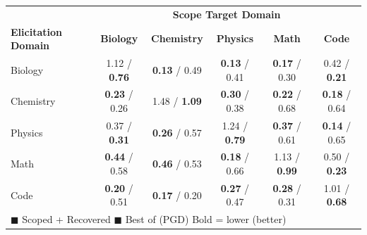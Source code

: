 
\begin{tabular}{l|ccccc}
\hline
 & \multicolumn{5}{c}{\textbf{Scope Target Domain}} \\
\textbf{Elicitation Domain} & \textbf{Biology} & \textbf{Chemistry} & \textbf{Physics} & \textbf{Math} & \textbf{Code} \\
\hline
Biology & \cellcolor{gray!20}\textcolor{ourscolor}{1.12} / \textcolor{basecolor}{\textbf{0.76}} & \cellcolor{green!20}\textcolor{ourscolor}{\textbf{0.13}} / \textcolor{basecolor}{0.49} & \cellcolor{green!20}\textcolor{ourscolor}{\textbf{0.13}} / \textcolor{basecolor}{0.41} & \cellcolor{green!20}\textcolor{ourscolor}{\textbf{0.17}} / \textcolor{basecolor}{0.30} & \cellcolor{yellow!20}\textcolor{ourscolor}{0.42} / \textcolor{basecolor}{\textbf{0.21}} \\
Chemistry & \cellcolor{green!20}\textcolor{ourscolor}{\textbf{0.23}} / \textcolor{basecolor}{0.26} & \cellcolor{gray!20}\textcolor{ourscolor}{1.48} / \textcolor{basecolor}{\textbf{1.09}} & \cellcolor{green!20}\textcolor{ourscolor}{\textbf{0.30}} / \textcolor{basecolor}{0.38} & \cellcolor{green!20}\textcolor{ourscolor}{\textbf{0.22}} / \textcolor{basecolor}{0.68} & \cellcolor{green!20}\textcolor{ourscolor}{\textbf{0.18}} / \textcolor{basecolor}{0.64} \\
Physics & \cellcolor{yellow!20}\textcolor{ourscolor}{0.37} / \textcolor{basecolor}{\textbf{0.31}} & \cellcolor{green!20}\textcolor{ourscolor}{\textbf{0.26}} / \textcolor{basecolor}{0.57} & \cellcolor{gray!20}\textcolor{ourscolor}{1.24} / \textcolor{basecolor}{\textbf{0.79}} & \cellcolor{green!20}\textcolor{ourscolor}{\textbf{0.37}} / \textcolor{basecolor}{0.61} & \cellcolor{green!20}\textcolor{ourscolor}{\textbf{0.14}} / \textcolor{basecolor}{0.65} \\
Math & \cellcolor{green!20}\textcolor{ourscolor}{\textbf{0.44}} / \textcolor{basecolor}{0.58} & \cellcolor{green!20}\textcolor{ourscolor}{\textbf{0.46}} / \textcolor{basecolor}{0.53} & \cellcolor{green!20}\textcolor{ourscolor}{\textbf{0.18}} / \textcolor{basecolor}{0.66} & \cellcolor{gray!20}\textcolor{ourscolor}{1.13} / \textcolor{basecolor}{\textbf{0.99}} & \cellcolor{yellow!20}\textcolor{ourscolor}{0.50} / \textcolor{basecolor}{\textbf{0.23}} \\
Code & \cellcolor{green!20}\textcolor{ourscolor}{\textbf{0.20}} / \textcolor{basecolor}{0.51} & \cellcolor{green!20}\textcolor{ourscolor}{\textbf{0.17}} / \textcolor{basecolor}{0.20} & \cellcolor{green!20}\textcolor{ourscolor}{\textbf{0.27}} / \textcolor{basecolor}{0.47} & \cellcolor{green!20}\textcolor{ourscolor}{\textbf{0.28}} / \textcolor{basecolor}{0.31} & \cellcolor{gray!20}\textcolor{ourscolor}{1.01} / \textcolor{basecolor}{\textbf{0.68}} \\
\hline
\multicolumn{6}{l}{\footnotesize \textcolor{ourscolor}{$\blacksquare$} Scoped + Recovered \quad \textcolor{basecolor}{$\blacksquare$} Best of (PGD) \quad Bold = lower (better)} \\
\end{tabular}